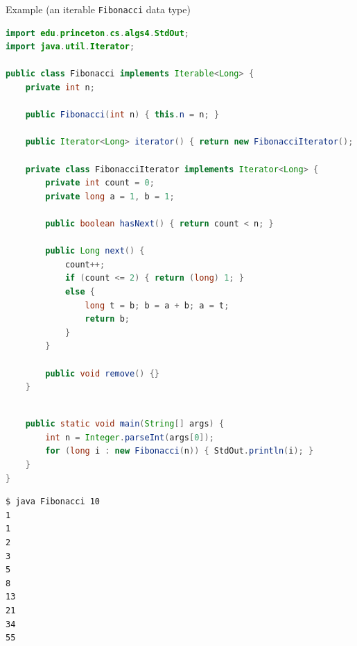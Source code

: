 \documentclass[8pt,a4paper,compress]{beamer}
\begin{document}
\begin{frame}[fragile]
\pause

Example (an iterable \lstinline{Fibonacci} data type)

\smallskip

\begin{lstlisting}[language=Java,style=focusin]
import edu.princeton.cs.algs4.StdOut;
import java.util.Iterator;

public class Fibonacci implements Iterable<Long> {
    private int n;

    public Fibonacci(int n) { this.n = n; }

    public Iterator<Long> iterator() { return new FibonacciIterator(); }

    private class FibonacciIterator implements Iterator<Long> {
        private int count = 0;
        private long a = 1, b = 1;

        public boolean hasNext() { return count < n; }

        public Long next() {
            count++;
            if (count <= 2) { return (long) 1; }
            else { 
                long t = b; b = a + b; a = t;
                return b;
            }
        }
        
        public void remove() {}
    }
\end{lstlisting}
\end{frame}

\begin{frame}[fragile]
\pause

\begin{lstlisting}[language=Java,style=focusin]

    public static void main(String[] args) {
        int n = Integer.parseInt(args[0]);
        for (long i : new Fibonacci(n)) { StdOut.println(i); }
    }
}
\end{lstlisting}

\pause\bigskip

\begin{lstlisting}[language={},style=focusin]
$ java Fibonacci 10
1
1
2
3
5
8
13
21
34
55
\end{lstlisting}
\end{frame}
\end{document}
